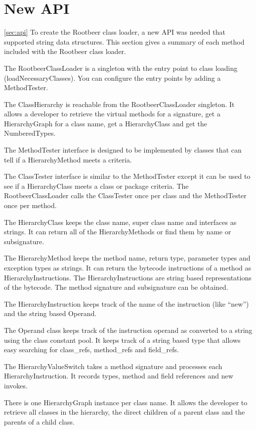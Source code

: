 \documentclass[preprint]{sigplanconf}
\begin{document}
\section{New API}
\ref{sec:api}
To create the Rootbeer class loader, a new API was needed that supported string data structures. This section gives a summary of each method included with the Rootbeer class loader.

The RootbeerClassLoader is a singleton with the entry point to class loading (loadNecessaryClasses). You can configure the entry points by adding a MethodTester.

The ClassHierarchy is reachable from the RootbeerClassLoader singleton. It allows a developer to retrieve the virtual methods for a signature, get a HierarchyGraph for a class name, get a HierarchyClass and get the NumberedTypes.

The MethodTester interface is designed to be implemented by classes that can tell if a HierarchyMethod meets a criteria.

The ClassTester interface is similar to the MethodTester except it can be used to see if a HierarchyClass meets a class or package criteria. The RootbeerClassLoader calls the ClassTester once per class and the MethodTester once per method.

The HierarchyClass keeps the class name, super class name and interfaces as strings. It can return all of the HierarchyMethods or find them by name or subsignature.

The HierarchyMethod keeps the method name, return type, parameter types and exception types as strings. It can return the bytecode instructions of a method as HierarchyInstructions. The HierarchyInstructions are string based representations of the bytecode. The method signature and subsignature can be obtained.

The HierarchyInstruction keeps track of the name of the instruction (like “new”) and the string based Operand.

The Operand class keeps track of the instruction operand as converted to a string using the class constant pool. It keeps track of a string based type that allows easy searching for class\_refs, method\_refs and field\_refs.

The HierarchyValueSwitch takes a method signature and processes each HierarchyInstruction. It records types, method and field references and new invokes.

There is one HierarchyGraph instance per class name. It allows the developer to retrieve all classes in the hierarchy, the direct children of a parent class and the parents of a child class. 
\end{document}
